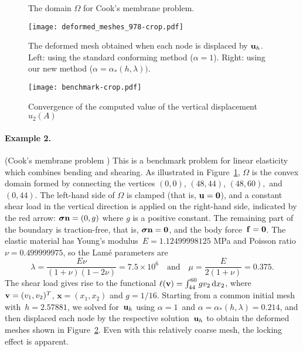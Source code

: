 \documentclass[11pt]{article}
\newcommand{\vf}{{\bf f}}
\newcommand{\vn}{{\bf n}}
\newcommand{\vu}{{\bf u}}
\newcommand{\vv}{{\bf v}}
\newcommand{\bsx}{{\boldsymbol{x}}}
\newcommand{\vsigma}{\boldsymbol{\sigma}}
\numberwithin{equation}{section}
\newcommand{\ud}{\mathrm{d}}
\begin{document}
\begin{figure}
\begin{center}
\end{center}
\caption{The domain $\Omega$ for Cook's membrane problem.}\label{fig: benchmark problem}
\end{figure}

\begin{figure}
\centering
\texttt{[image: deformed\_meshes\_978-crop.pdf]}
\caption{The deformed mesh obtained when each node is displaced by $\vu_h$.  Left: using the standard
conforming method ($\alpha=1$).  Right: using our new method 
($\alpha=\alpha_*(h,\lambda))$.}
\label{fig: deformed mesh}
\end{figure}

\begin{figure}
\centering
\texttt{[image: benchmark-crop.pdf]}
\caption{Convergence of the computed value of the vertical displacement $u_2(A)$}
\label{fig: benchmark}
\end{figure}
\paragraph{Example 2.} (Cook’s membrane problem \cite{Cook1974}) This is a benchmark problem for linear elasticity which combines bending and shearing.  As illustrated in Figure~\ref{fig: benchmark problem},  
$\Omega$ is the convex domain formed by connecting the vertices $(0,0)$, $(48,44)$, $(48,60),$ and $(0,44)$.
The left-hand side of $\Omega$ is clamped (that is, $\vu={\bf 0}$), and a constant shear load in the vertical
direction is applied on the right-hand side, indicated by the red arrow: $\vsigma \vn =(0,g)$ where $g$ is 
a positive constant.  The remaining  part of the boundary is traction-free, that is, $\vsigma \vn={\bf 0}$, 
and the body  force~$\vf={\bf 0}$.  The elastic material has Young's modulus~$E=1.12499998125$ MPa and 
Poisson ratio~$\nu=0.499999975$, so  the Lam\'e parameters are
\[\lambda=\frac{E\nu}{(1+\nu)(1-2\nu)}=7.5\times10^6\quad\text{and}\quad  
\mu= \frac{E}{2(1+\nu)}=0.375.\]
The shear load gives rise to the functional $\ell(\vv) = \int_{44}^{60}g v_2\,\ud x_2$, where 
$\vv=(v_1,v_2)^T$, $\bsx=(x_1,x_2)$ and $g=1/16$.  Starting from a common initial mesh with~$h=2.57881$, we solved for~$\vu_h$ using $\alpha=1$~and $\alpha=\alpha_*(h,\lambda)=0.214$, and then displaced each node by
the respective solution~$\vu_h$ to obtain the deformed meshes shown in Figure~\ref{fig: deformed mesh}.  Even with this relatively coarse mesh, the
locking effect is apparent.
\end{document}
